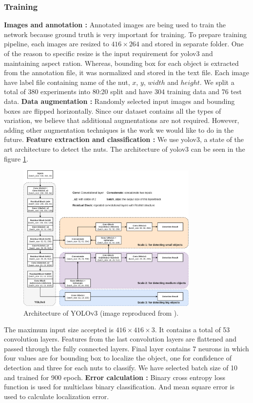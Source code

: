 \documentclass[journal,onecolumn,12pt]{IEEEtran}
\begin{document}
\subsubsection{\textbf{Training}} 
\textbf{\newline Images and annotation :} Annotated images are being used to train the network because ground truth is very important for training. To prepare training pipeline, each images are resized to $416 \times 264$ and stored in separate folder. One of the reason to specific resize is the input requirement for \gls{yolov3} and maintaining aspect ration. Whereas, bounding box for each object is extracted from the annotation file, it was normalized and stored in the text file. Each image have label file containing name of the nut, $x$, $y$, $width$ and $height$. We split a total of 380 experiments into 80:20 split and have 304 training data and 76 test data.
\textbf{\newline Data augmentation :} Randomly selected input images and bounding boxes are flipped horizontally. Since our dataset contains all the types of variation, we believe that additional augmentations are not required. However, adding other augmentation techniques is the work we would like to do in the future.
\textbf{\newline Feature extraction and classification :} We use \gls{yolov3}\cite{Joseph2018}, a state of the art architecture to detect the nuts. The architecture of \gls{yolov3} can be seen in the figure \ref{fig:yoloArchitecture}. 
\begin{figure}[h]
	\centering
	\includegraphics[width=0.8\textwidth]{images/YOLOv3_architecture.png}
	\caption{Architecture of YOLOv3 (image reproduced from \cite{yoloArch}).}
	\label{fig:yoloArchitecture}
\end{figure}
The maximum input size accepted is $416 \times 416 \times 3$. It contains a total of 53 convolution layers. Features from the last convolution layers are flattened and passed through the fully connected layers. Final layer contains 7 neurons in which four values are for bounding box to localize the object, one for confidence of detection and three for each nuts to classify. We have selected batch size of 10 and trained for 900 epoch.
\textbf{\newline Error calculation :} Binary cross entropy loss function is used for multiclass binary classification. And mean square error is used to calculate localization error.
\end{document}
